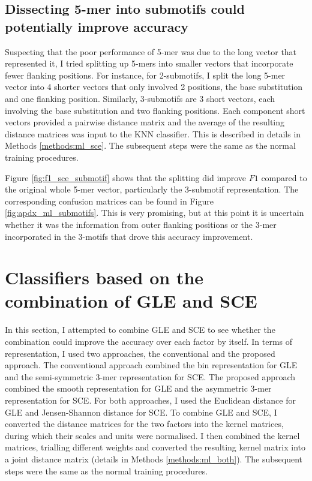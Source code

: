 

\subsection{Dissecting 5-mer into submotifs could potentially improve accuracy}
Suspecting that the poor performance of 5-mer was due to the long vector that represented it, I tried splitting up 5-mers into smaller vectors that incorporate fewer flanking positions. For instance, for 2-submotifs, I split the long 5-mer vector into 4 shorter vectors that only involved 2 positions, the base substitution and one flanking position. Similarly, 3-submotifs are 3 short vectors, each involving the base substitution and two flanking positions. Each component short vectors provided a pairwise distance matrix and the average of the resulting distance matrices was input to the KNN classifier. This is described in details in Methods \ref{methods:ml_sce}. The subsequent steps were the same as the normal training procedures.

Figure \ref{fig:f1_sce_submotif} shows that the splitting did improve $F1$ compared to the original whole 5-mer vector, particularly the 3-submotif representation. The corresponding confusion matrices can be found in Figure \ref{fig:apdx_ml_submotifs}. This is very promising, but at this point it is uncertain whether it was the information from outer flanking positions or the 3-mer incorporated in the 3-motifs that drove this accuracy improvement.



\section{Classifiers based on the combination of GLE and SCE}\label{ml:both}
In this section, I attempted to combine GLE and SCE to see whether the combination could improve the accuracy over each factor by itself. In terms of representation, I used two approaches, the conventional and the proposed approach. The conventional approach combined the bin representation for GLE and the semi-symmetric 3-mer representation for SCE. The proposed approach combined the smooth representation for GLE and the asymmetric 3-mer representation for SCE. For both approaches, I used the Euclidean distance for GLE and Jensen-Shannon distance for SCE. To combine GLE and SCE, I converted the distance matrices for the two factors into the kernel matrices, during which their scales and units were normalised. I then combined the kernel matrices, trialling different weights and converted the resulting kernel matrix into a joint distance matrix (details in Methods \ref{methods:ml_both}). The subsequent steps were the same as the normal training procedures.

